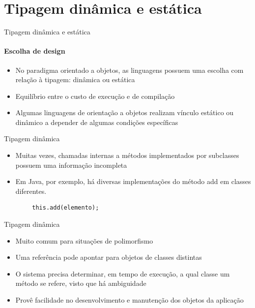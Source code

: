 \section{Tipagem dinâmica e estática}

\begin{frame}{Tipagem dinâmica e estática}
\framesubtitle{Escolha de design}
\begin{itemize}
    \item No paradigma orientado a objetos, as linguagens possuem uma escolha com relação à tipagem: dinâmica ou estática
    \item Equilíbrio entre o custo de execução e de compilação
    \item Algumas linguagens de orientação a objetos realizam vínculo estático ou dinâmico a depender de algumas condições específicas
\end{itemize} 
\end{frame}

\begin{frame}[fragile]{Tipagem dinâmica}
\begin{itemize}
    \item Muitas vezes, chamadas internas a métodos implementados por subclasses possuem uma informação incompleta
    \item Em Java, por exemplo, há diversas implementações do método add em classes diferentes.
\end{itemize}
\begin{verbatim}
        this.add(elemento);
\end{verbatim}
\end{frame}

\begin{frame}[fragile]{Tipagem dinâmica}
\begin{itemize}
    \item Muito comum para situações de polimorfismo
    \item Uma referência pode apontar para objetos de classes distintas
    \item O sistema precisa determinar, em tempo de execução, a qual classe um método se refere, visto que há ambiguidade
    \item Provê facilidade no desenvolvimento e manutenção dos objetos da aplicação
\end{itemize}
\end{frame}


